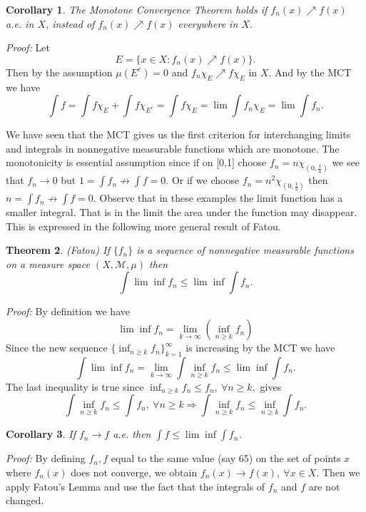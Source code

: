 \documentclass[12pt]{report}
\newtheorem{theorem}{Theorem}[section]
\newtheorem{corollary}[theorem]{Corollary}
\begin{document}
\begin{corollary}  The Monotone Convergence Theorem holds if $f_n (x)
\nearrow f(x)$ a.e. in $X$, instead of $f_n(x) \nearrow f(x)$ everywhere
in $X$.
\end{corollary}

\medskip
\noindent
\textit{Proof:}  Let
\[ E = \{x \in X: f_n (x) \nearrow f(x) \}.
\] Then by the assumption $\mu(E^c) = 0$ and $f_n \chi_E \nearrow f
\chi_E$ in $X$.  And by the MCT we have
\[
\int f = \int f \chi_E + \int f \chi_{E^c} = \int f \chi_E = \lim
\int f_n \chi_E = \lim \int f_n.
\]


We have seen that the MCT gives us the first criterion for
interchanging limits and integrals in nonnegative measurable functions
which are monotone.  The monotonicity is essential  assumption since
if on [0,1] choose  $f_n = n
\chi_{(0, \frac{1}{n})}$ we see that $f_n \longrightarrow 0$ but $1 = \int
f_n
\not\longrightarrow \int f = 0$.  Or if we choose  $f_n = n^2 \chi_{(0,
\frac{1}{2})}$ then $n = \int f_n \not\longrightarrow \int f = 0$. 
Observe that in these examples the limit function has a smaller
integral.  That is in the limit the area under the function may
disappear.  This is expressed in the following more general result of
Fatou.
 \begin{theorem} (Fatou)  If $\{f_n\}$ is a sequence of nonnegative
measurable functions on a measure space $(X, \mathcal{M}, \mu)$ then
\[
\int \lim \inf f_n \le \lim \inf \int f_n. 
\]
\end{theorem}
\textit{Proof:}  By definition we have
\[
\lim \inf f_n = \lim_{k \to \infty} \left ( \inf_{n \ge k} f_n \right )
\] 
Since the new sequence $\{\inf_{n \ge k} f_n
\}^\infty_{k=1}$ 
is increasing by the MCT we have
\[
\int \lim \inf f_n = \lim_{k \to \infty}
\int  {\inf}_{n \ge k} f_n \le \lim \inf \int f_n. 
\] 
The last inequality is true since ${\inf}_{n \ge k} f_n 
\le f_n, \
\forall n
\ge k,$ gives
\[
\int \inf_{n \ge k} f_n \le \int f_n, \ \forall n \ge k \Longrightarrow \int
\inf_{n \ge k} f_n \le \inf_{n \ge k} \int f_n. 
\]


\begin{corollary}  If $f_n \longrightarrow f $ a.e. then $\int f \le \lim
\inf \int f_n$.
\end{corollary} 

\medskip
\noindent
\textit{Proof:}  By defining $f_n, f$ equal to the same value (say 65) on
the set of points $x$ where $f_n (x)$ does not converge, we obtain
$f_n(x) \longrightarrow f(x), \ \forall x \in X$.  Then we apply Fatou's
Lemma and use the fact that  the integrals of $f_n$ and $f$ are not
changed.
\end{document}
